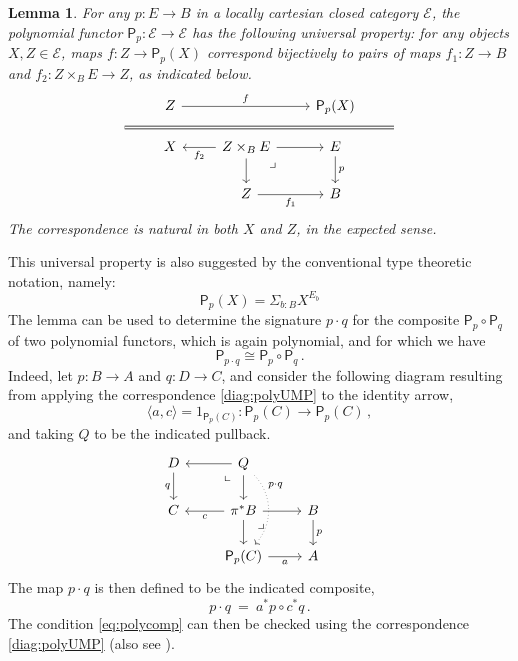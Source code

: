 \documentclass[12pt,reqno]{amsart}
\newcommand{\EE}{\ensuremath{\mathcal{E}}}
\newcommand{\alg}[1]{\ensuremath{\mathsf{#1}}}
\renewcommand{\to}{\ensuremath{\rightarrow}}
\newcommand{\pbcorner}{\arrow[dr,phantom,"\lrcorner" very near start, shift right=.5ex]} %
\newcommand{\pbcornerright}{\arrow[dl,phantom,"\llcorner" very near start, shift left=.5ex]} %
\newtheorem{lemma}[theorem]{Lemma}
\theoremstyle{remark}
\theoremstyle{definition}
\begin{document}
\begin{lemma}
 For any $p: E \to B$ in a locally cartesian closed category $\EE$, the polynomial functor $\alg{P}_p : \EE \to \EE$ has the following universal property:  for any objects $X, Z \in \EE$, maps $f : Z \to \alg{P}_p (X)$ correspond bijectively to pairs of maps $f_1 : Z \to B$ and $f_2 : Z\times_B E \to Z$, as indicated below.
\begin{equation}\label{diag:polyUMP}
\begin{tikzcd}
&Z \ar[rr,"f"] && \alg{P}_p (X) & \\[-5ex]
\strut \ar[rrrr, equal] &&&& \strut\\[-5ex]
&X & \ar[l,"f_2"] Z\times_B E \ar[d] \ar[r] \pbcorner & E \ar[d, "p"] &\\
&& Z \ar[r,swap,"f_1"] & B &
\end{tikzcd}
\end{equation}
The correspondence is natural in both $X$ and $Z$, in the expected sense.
\end{lemma}

This universal property is also suggested by the conventional type theoretic notation, namely: $$\alg{P}_p (X) = \Sigma_{b:B} X^{E_b}$$
The lemma can be used to determine the signature $ p\cdot q $ for the composite $\alg{P}_p \circ \alg{P}_q$ of two polynomial functors, which is again polynomial, and for which we have
\begin{equation}\label{eq:polycomp}
\alg{P}_{p\cdot q} \cong \alg{P}_p \circ \alg{P}_q\,.
\end{equation}
Indeed, let $p : B \to A$ and $q : D \to C$, and consider the following diagram resulting from applying the correspondence \eqref{diag:polyUMP} to the identity arrow,
\[
\langle a, c\rangle = 1_{\alg{P}_p(C)} : \alg{P}_p(C) \to \alg{P}_p(C)\,,
\]
and taking $Q$ to be the indicated pullback.
%
\begin{equation}\label{diag:polyUMP}
\begin{tikzcd}
D \ar[d,swap,"q"] & \ar[l] Q \ar[d] \pbcornerright  \ar[dd, dotted, bend left = 10ex ,near start, "{p\cdot q}"]& & \\
 C  & \ar[l,"c"] \pi^*B \ar[d] \ar[r] \pbcorner & B \ar[d,"p"] \\
&  \alg{P}_p(C) \ar[r,swap,"a"] & A
\end{tikzcd}
\end{equation}
The map $p\cdot q$ is then defined to be the indicated composite,
\[
p\cdot q\ =\ a^*p \circ c^*q\,.
\]
The condition \eqref{eq:polycomp} can then be checked using the correspondence \eqref{diag:polyUMP} (also see \cite{GambinoKoch:2013}).
\end{document}
